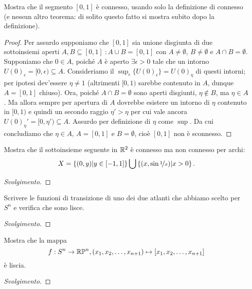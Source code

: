 \documentclass[a4paper, 12pt, italian]{article}
\begin{document}
\begin{exercise}
Mostra che il segmento $[0, 1]$ è connesso, usando solo la definizione di
connesso (e nessun altro teorema: di solito questo fatto si mostra subito dopo
la definizione).
\begin{proof}
Per assurdo supponiamo che $[0, 1]$ sia unione disgiunta di due sottoinsiemi
aperti $A, B \subseteq [0, 1] \; : A \cup B = [0, 1]$ con
$A \neq \emptyset$, $B \neq \emptyset$ e $A \cap B = \emptyset$.
Supponiamo che $0 \in A$, poiché $A$ è aperto $\exists \epsilon > 0$
tale che un intorno $U(0)_\epsilon = [0, \epsilon) \subseteq A$.
Consideriamo il $\sup_\epsilon \{U(0)_\epsilon\} = U(0)_\eta$ di questi
intorni; per ipotesi dev'essere $\eta \neq 1$ (altrimenti $[0, 1)$ sarebbe
contenuto in $A$, dunque $A = [0, 1]$ chiuso). Ora, poiché 
$A \cap B = \emptyset$ sono aperti disgiunti, $\eta \not\in B$, ma
$\eta \in A$. Ma allora sempre per apertura di $A$ dovrebbe esistere un
intorno di $\eta$ contenuto in $[0, 1)$ e quindi un secondo raggio 
$\eta' > \eta$ per cui vale ancora $U(0)_\eta' = [0, \eta') \subseteq A$.
Assurdo per definizione di $\eta$ come $\sup$. Da cui concludiamo che
$\eta \in A$, $A = [0, 1]$ e $B = \emptyset$, cioè $[0, 1]$ non è
sconnesso.

\end{proof}
\end{exercise}

\begin{exercise}
Mostra che il sottoinsieme seguente in $\mathbb{R}^2$ è connesso ma non connesso per
archi:
\[
X = \left\{(0, y) | y \in [-1, 1]\right\} \bigcup
\left\{(x, \sin{\nicefrac{1}{x}}) | x > 0\right\}
.\]
\begin{proof}[Svolgimento]

\end{proof}
\end{exercise}

\begin{exercise}
Scrivere le funzioni di transizione di uno dei due atlanti che abbiamo scelto
per $S^n$ e verifica che sono lisce.
\begin{proof}[Svolgimento]

\end{proof}
\end{exercise}

\begin{exercise}
Mostra che la mappa
\[
f: S^n \to \mathbb{R}\mathbb{P}^n, (x_1, x_2, \ldots, x_{n+1}) \mapsto
[x_1, x_2, \ldots, x_{n+1}]
\]
è liscia.
\begin{proof}[Svolgimento]

\end{proof}
\end{exercise}
\end{document}
